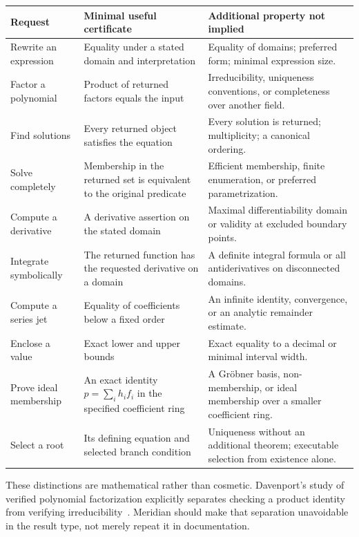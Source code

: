 \documentclass[11pt,a4paper]{article}
\theoremstyle{remark}
\begin{document}
\begin{longtable}{@{}L{.20\textwidth}L{.36\textwidth}L{.36\textwidth}@{}}
\toprule
Request & Minimal useful certificate & Additional property not implied \\
\midrule
\endhead
Rewrite an expression & Equality under a stated domain and interpretation &
Equality of domains; preferred form; minimal expression size.\\
Factor a polynomial & Product of returned factors equals the input &
Irreducibility, uniqueness conventions, or completeness over another field.\\
Find solutions & Every returned object satisfies the equation &
Every solution is returned; multiplicity; a canonical ordering.\\
Solve completely & Membership in the returned set is equivalent to the original
predicate & Efficient membership, finite enumeration, or preferred parametrization.\\
Compute a derivative & A derivative assertion on the stated domain &
Maximal differentiability domain or validity at excluded boundary points.\\
Integrate symbolically & The returned function has the requested derivative on a
domain & A definite integral formula or all antiderivatives on disconnected domains.\\
Compute a series jet & Equality of coefficients below a fixed order &
An infinite identity, convergence, or an analytic remainder estimate.\\
Enclose a value & Exact lower and upper bounds & Exact equality to a decimal or
minimal interval width.\\
Prove ideal membership & An exact identity $p=\sum_i h_i f_i$ in the specified
coefficient ring & A Gr\"obner basis, non-membership, or ideal membership over a
smaller coefficient ring.\\
Select a root & Its defining equation and selected branch condition &
Uniqueness without an additional theorem; executable selection from existence alone.\\
\bottomrule
\end{longtable}

These distinctions are mathematical rather than cosmetic. Davenport's study of
verified polynomial factorization explicitly separates checking a product identity
from verifying irreducibility~\cite{davenport}. Meridian should make that
separation unavoidable in the result type, not merely repeat it in documentation.
\end{document}
